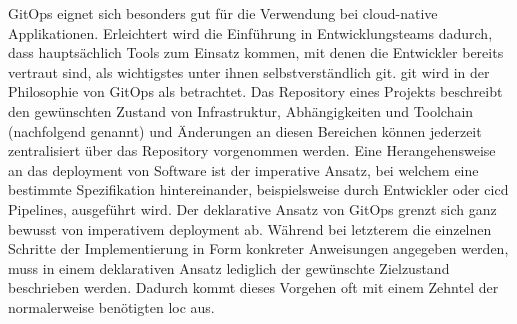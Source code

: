 GitOps eignet sich besonders gut für die Verwendung bei \gls{cloud-native} Applikationen. Erleichtert wird die Einführung in Entwicklungsteams dadurch, dass hauptsächlich Tools zum Einsatz kommen, mit denen die Entwickler bereits vertraut sind, als wichtigstes unter ihnen selbstverständlich \Gls{git}. \cite{109:GitOps} \Gls{git} wird in der Philosophie von GitOps als  betrachtet. Das Repository eines Projekts beschreibt den gewünschten Zustand von Infrastruktur, Abhängigkeiten und Toolchain (nachfolgend  genannt) und Änderungen an diesen Bereichen können jederzeit zentralisiert über das Repository vorgenommen werden. \cite{007:Analysis-of-Declarative-and-Pull-based-Deployment-Models-on-GitOps,010:Efficient-Application-Deployment-GitOps-for-Faster-and-Secure-CI-CD-Cycles,109:GitOps} Eine Herangehensweise an das \Gls{deployment} von Software ist der imperative Ansatz, bei welchem eine bestimmte Spezifikation hintereinander, beispielsweise durch Entwickler oder \Gls{cicd} Pipelines, ausgeführt wird. Der deklarative Ansatz von GitOps grenzt sich ganz bewusst von imperativem \Gls{deployment} ab. Während bei letzterem die einzelnen Schritte der Implementierung in Form konkreter Anweisungen angegeben werden, muss in einem deklarativen Ansatz lediglich der gewünschte Zielzustand beschrieben werden. Dadurch kommt dieses Vorgehen oft mit einem Zehntel der normalerweise benötigten \Gls{loc} aus. \cite{007:Analysis-of-Declarative-and-Pull-based-Deployment-Models-on-GitOps}

